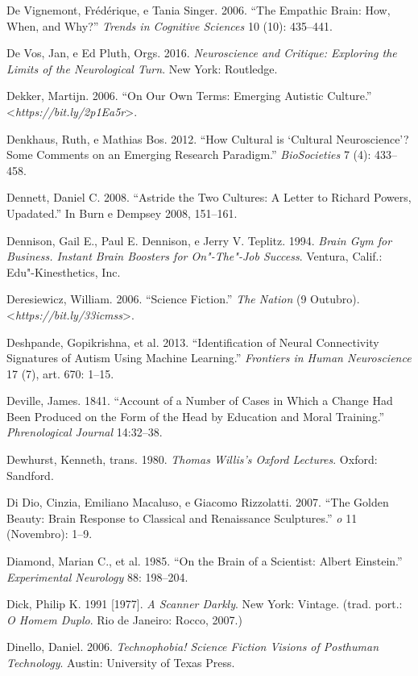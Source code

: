 {\begin{Parskip}
De Vignemont, Frédérique, e Tania Singer. 2006. ``The Empathic Brain:
How, When, and Why?'' \emph{Trends in Cognitive Sciences} 10 (10):
435--441.

De Vos, Jan, e Ed Pluth, Orgs. 2016. \emph{Neuroscience and Critique:
Exploring the Limits of the Neurological Turn}. New York: Routledge.

Dekker, Martijn. 2006. ``On Our Own Terms: Emerging Autistic Culture.''
\textless{}\emph{https://bit.ly/2p1Ea5r}\textgreater{}.

Denkhaus, Ruth, e Mathias Bos. 2012. ``How Cultural is `Cultural
Neuroscience'? Some Comments on an Emerging Research Paradigm.''
\emph{BioSocieties} 7 (4): 433--458.

Dennett, Daniel C. 2008. ``Astride the Two Cultures: A Letter to Richard
Powers, Upadated.'' In Burn e Dempsey 2008, 151--161.

Dennison, Gail E., Paul E. Dennison, e Jerry V. Teplitz. 1994.
\emph{Brain Gym for Business. Instant Brain Boosters for On"-The"-Job
Success}. Ventura, Calif.: Edu"-Kinesthetics, Inc.

Deresiewicz, William. 2006. ``Science Fiction.'' \emph{The Nation} (9
Outubro).
\textless{}\emph{https://bit.ly/33icmss}\textgreater{}.

Deshpande, Gopikrishna, et al. 2013. ``Identification of Neural
Connectivity Signatures of Autism Using Machine Learning.''
\emph{Frontiers in Human Neuroscience} 17 (7), art. 670: 1--15.

Deville, James. 1841. ``Account of a Number of Cases in Which a Change
Had Been Produced on the Form of the Head by Education and Moral
Training.'' \emph{Phrenological Journal} 14:32--38.

Dewhurst, Kenneth, trans. 1980. \emph{Thomas Willis's Oxford Lectures}.
Oxford: Sandford.

Di Dio, Cinzia, Emiliano Macaluso, e Giacomo Rizzolatti. 2007. ``The
Golden Beauty: Brain Response to Classical and Renaissance Sculptures.''
\emph{o} 11 (Novembro): 1--9.

Diamond, Marian C., et al. 1985. ``On the Brain of a Scientist: Albert
Einstein.'' \emph{Experimental Neurology} 88: 198--204.

Dick, Philip K. 1991 {[}1977{]}. \emph{A Scanner Darkly}. New York:
Vintage. (trad. port.: \emph{O Homem Duplo}. Rio de Janeiro: Rocco,
2007.)

Dinello, Daniel. 2006. \emph{Technophobia! Science Fiction Visions of
Posthuman Technology}. Austin: University of Texas Press.


\end{Parskip}}
